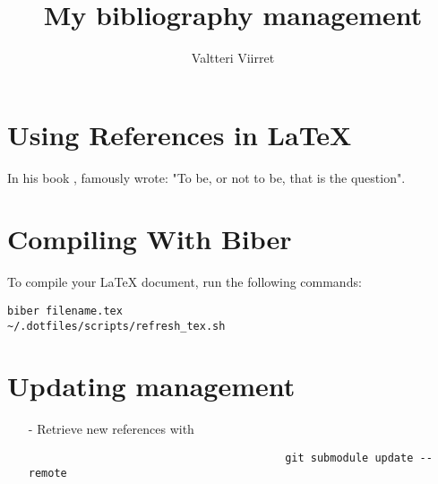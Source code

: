 \documentclass{article}
\author{Valtteri Viirret}
\title{My bibliography management}
\begin{document}
\maketitle

\section{Using References in LaTeX}

In his book \textcite{shakespeare}, famously wrote: "To be, or not to be, that is the question".

\section{Compiling With Biber}

To compile your LaTeX document, run the following commands:

\begin{verbatim}
biber filename.tex
~/.dotfiles/scripts/refresh_tex.sh
\end{verbatim}

\section{Updating management}
\begin{itemize}
	\item[-] Retrieve new references with \begin{verbatim}
										git submodule update --remote
										\end{verbatim}
\end{itemize}

\printbibliography
\end{document}

